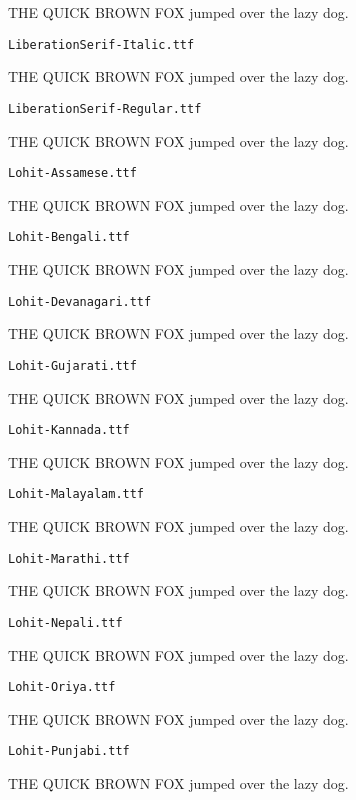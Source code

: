 \documentclass{article}
\begin{document}
THE QUICK BROWN FOX jumped over the lazy dog.

\setmainfont[Extension=.ttf]{LiberationSerif-Italic}
\noindent \verb!LiberationSerif-Italic.ttf!

THE QUICK BROWN FOX jumped over the lazy dog.

\setmainfont[Extension=.ttf]{LiberationSerif-Regular}
\noindent \verb!LiberationSerif-Regular.ttf!

THE QUICK BROWN FOX jumped over the lazy dog.

\setmainfont[Extension=.ttf]{Lohit-Assamese}
\noindent \verb!Lohit-Assamese.ttf!

THE QUICK BROWN FOX jumped over the lazy dog.

\setmainfont[Extension=.ttf]{Lohit-Bengali}
\noindent \verb!Lohit-Bengali.ttf!

THE QUICK BROWN FOX jumped over the lazy dog.

\setmainfont[Extension=.ttf]{Lohit-Devanagari}
\noindent \verb!Lohit-Devanagari.ttf!

THE QUICK BROWN FOX jumped over the lazy dog.

\setmainfont[Extension=.ttf]{Lohit-Gujarati}
\noindent \verb!Lohit-Gujarati.ttf!

THE QUICK BROWN FOX jumped over the lazy dog.

\setmainfont[Extension=.ttf]{Lohit-Kannada}
\noindent \verb!Lohit-Kannada.ttf!

THE QUICK BROWN FOX jumped over the lazy dog.

\setmainfont[Extension=.ttf]{Lohit-Malayalam}
\noindent \verb!Lohit-Malayalam.ttf!

THE QUICK BROWN FOX jumped over the lazy dog.

\setmainfont[Extension=.ttf]{Lohit-Marathi}
\noindent \verb!Lohit-Marathi.ttf!

THE QUICK BROWN FOX jumped over the lazy dog.

\setmainfont[Extension=.ttf]{Lohit-Nepali}
\noindent \verb!Lohit-Nepali.ttf!

THE QUICK BROWN FOX jumped over the lazy dog.

\setmainfont[Extension=.ttf]{Lohit-Oriya}
\noindent \verb!Lohit-Oriya.ttf!

THE QUICK BROWN FOX jumped over the lazy dog.

\setmainfont[Extension=.ttf]{Lohit-Punjabi}
\noindent \verb!Lohit-Punjabi.ttf!

THE QUICK BROWN FOX jumped over the lazy dog.
\end{document}
